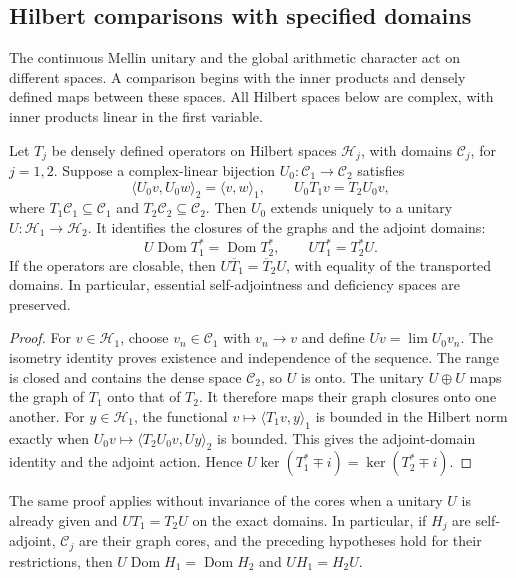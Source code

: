 \subsection{Hilbert comparisons with specified domains}
\label{v4-arith:mc:comparisons}

The continuous Mellin unitary and the global arithmetic character
act on different spaces. A comparison begins with the inner products
and densely defined maps between these spaces. All Hilbert spaces
below are complex, with inner products linear in the first variable.

\begin{proposition}
\label{v4-arith:mc:core-unitary}
Let $T_j$ be densely defined operators on Hilbert spaces
$\mathcal H_j$, with domains $\mathcal C_j$, for $j=1,2$.
Suppose a complex-linear bijection $U_0:\mathcal C_1\to\mathcal C_2$
satisfies
\[
 \langle U_0v,U_0w\rangle_2=\langle v,w\rangle_1,
 \qquad U_0T_1v=T_2U_0v,
\]
where $T_1\mathcal C_1\subseteq\mathcal C_1$ and
$T_2\mathcal C_2\subseteq\mathcal C_2$.
Then $U_0$ extends uniquely to a unitary $U:\mathcal H_1\to\mathcal H_2$.
It identifies the closures of the graphs and the adjoint domains:
\[
 U\operatorname{Dom}T_1^*=\operatorname{Dom}T_2^*,\qquad
 UT_1^*=T_2^*U.
\]
If the operators are closable, then
$U\overline T_1=\overline T_2U$, with equality of the transported
domains. In particular, essential self-adjointness and deficiency
spaces are preserved.
\end{proposition}
\begin{proof}
For $v\in\mathcal H_1$, choose $v_n\in\mathcal C_1$ with $v_n\to v$
and define $Uv=\lim U_0v_n$. The isometry identity proves existence
and independence of the sequence. The range is closed and contains
the dense space $\mathcal C_2$, so $U$ is onto.
The unitary $U\oplus U$ maps the graph of $T_1$ onto that of $T_2$.
It therefore maps their graph closures onto one another.
For $y\in\mathcal H_1$, the functional
$v\mapsto\langle T_1v,y\rangle_1$ is bounded in the Hilbert norm
exactly when $U_0v\mapsto\langle T_2U_0v,Uy\rangle_2$ is bounded.
This gives the adjoint-domain identity and the adjoint action.
Hence $U\ker(T_1^*\mp i)=\ker(T_2^*\mp i)$.
\end{proof}

The same proof applies without invariance of the cores when a
unitary $U$ is already given and $UT_1=T_2U$ on the exact domains.
In particular, if $H_j$ are self-adjoint, $\mathcal C_j$ are their
graph cores, and the preceding hypotheses hold for their restrictions,
then $U\operatorname{Dom}H_1=\operatorname{Dom}H_2$ and $UH_1=H_2U$.

